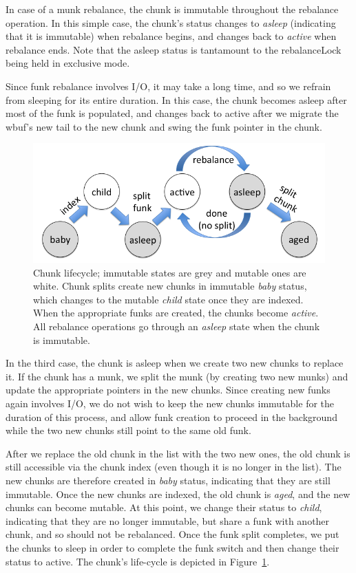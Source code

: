 In case of a munk rebalance, the chunk is immutable throughout the rebalance operation.
In this simple case, the chunk's status changes to \emph{asleep} (indicating that it is immutable)
when rebalance begins, and changes back to \emph{active} when rebalance ends. 
Note that the asleep status is tantamount to the rebalanceLock being held in exclusive mode.

Since funk rebalance involves I/O, it may take a long time, and so we  refrain from sleeping for its entire 
duration. In this case, the chunk becomes asleep after most of the funk is populated, and 
changes back to active after we 
migrate the wbuf's new tail to the new chunk and swing the funk pointer in the chunk.


\begin{figure}[htb]
\centerline{
\includegraphics[width=\columnwidth]{state-diagram.png}
}
\caption{Chunk lifecycle; immutable states are grey and mutable ones are white.
Chunk splits  create new chunks in immutable \emph{baby} status, which changes to the mutable \emph{child} state once they 
are indexed. When the appropriate funks are created, the chunks become \emph{active}. All rebalance operations go through an 
\emph{asleep} state when the chunk is immutable.}
\label{fig:status}
\end{figure}

In the third case, the chunk is asleep when we create two new chunks to replace it. 
If the chunk has a munk, we split the munk (by creating two new munks) and update the appropriate pointers in the new chunks.  
Since creating new funks again involves I/O, we do not wish to keep the new chunks immutable for the duration of this process,
and allow funk creation to proceed in the background while the two new chunks still point to the same old funk. 

After we replace the old chunk in the list with the two new ones, 
the old chunk is still accessible via the chunk index (even though it is no longer in the list). 
The new chunks are therefore created in \emph{baby} status, indicating that they are still immutable. 
Once the new chunks are indexed, the old chunk is \emph{aged}, and the new chunks can become mutable.
At this point, we change their status to \emph{child}, indicating that they are no longer immutable, but share a funk with another chunk,
and so should not be rebalanced. Once the funk split completes, we put the chunks to sleep in order
to complete the funk switch and then change their  status  to active. 
The chunk's life-cycle is depicted in Figure~\ref{fig:status}.

